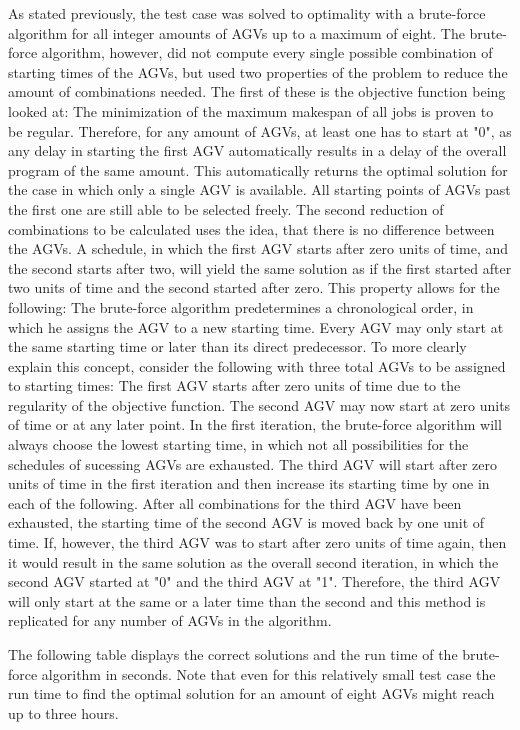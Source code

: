 As stated previously, the test case was solved to optimality with a brute-force algorithm for all integer amounts of AGVs up to a maximum of eight. The brute-force algorithm, however, did not compute every single possible combination of starting times of the AGVs, but used two properties of the problem to reduce the amount of combinations needed. The first of these is the objective function being looked at: The minimization of the maximum makespan of all jobs is proven to be regular. Therefore, for any amount of AGVs, at least one has to start at "0", as any delay in starting the first AGV automatically results in a delay of the overall program of the same amount. This automatically returns the optimal solution for the case in which only a single AGV is available. All starting points of AGVs past the first one are still able to be selected freely. The second reduction of combinations to be calculated uses the idea, that there is no difference between the AGVs. A schedule, in which the first AGV starts after zero units of time, and the second starts after two, will yield the same solution as if the first started after two units of time and the second started after zero. This property allows for the following: The brute-force algorithm predetermines a chronological order, in which he assigns the AGV to a new starting time. Every AGV may only start at the same starting time or later than its direct predecessor. To more clearly explain this concept, consider the following with three total AGVs to be assigned to starting times: The first AGV starts after zero units of time due to the regularity of the objective function. The second AGV may now start at zero units of time or at any later point. In the first iteration, the brute-force algorithm will always choose the lowest starting time, in which not all possibilities for the schedules of sucessing AGVs are exhausted. The third AGV will start after zero units of time in the first iteration and then increase its starting time by one in each of the following. After all combinations for the third AGV have been exhausted, the starting time of the second AGV is moved back by one unit of time. If, however, the third AGV was to start after zero units of time again, then it would result in the same solution as the overall second iteration, in which the second AGV started at "0" and the third AGV at "1". Therefore, the third AGV will only start at the same or a later time than the second and this method is replicated for any number of AGVs in the algorithm.

The following table displays the correct solutions and the run time of the brute-force algorithm in seconds. Note that even for this relatively small test case the run time to find the optimal solution for an amount of eight AGVs might reach up to three hours.

